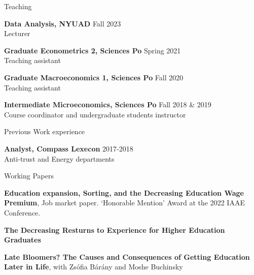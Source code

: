 \documentclass{resume} %
\begin{document}

\begin{rSection}{Teaching}

{\bf Data Analysis, NYUAD} \hfill {Fall 2023}
  \\ Lecturer

{\bf Graduate Econometrics 2, Sciences Po} \hfill {Spring 2021}
  \\ Teaching assistant

{\bf Graduate Macroeconomics 1, Sciences Po} \hfill {Fall 2020}
  \\ Teaching assistant


{\bf Intermediate Microeconomics, Sciences Po} \hfill {Fall 2018 \& 2019}
\\ Course coordinator and undergraduate students instructor

\end{rSection}


\begin{rSection}{Previous Work experience}


{\bf Analyst, Compass Lexecon} \hfill {2017-2018}
\\ Anti-trust and Energy departments


\end{rSection}


\begin{rSection}{Working Papers}

  {\bf Education expansion, Sorting, and the Decreasing Education Wage Premium}, Job market paper. ‘Honorable Mention' Award at the 2022 IAAE Conference.
  
  {\bf The Decreasing Resturns to Experience for Higher Education Graduates}

  {\bf Late Bloomers? The Causes and Consequences of Getting Education Later in Life}, with Zsófia Bárány and Moshe Buchinsky
  
  \end{rSection}
\end{document}
